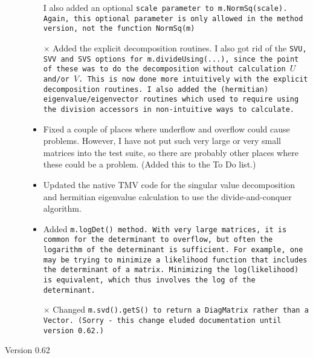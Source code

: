 \begin{description}
\begin{itemize}
I also added an optional \tt{scale} parameter to \tt{m.NormSq(scale)}.
Again, this optional parameter is only allowed in the method version, not the function \tt{NormSq(m)}
\item[$\times$]
Added the explicit decomposition routines.  I also
got rid of the \tt{SVU}, \tt{SVV} and \tt{SVS} options for \tt{m.divideUsing(...)}, since the point 
of these was to do the decomposition without calculation $U$ and/or $V$.  This is now done
more intuitively with the explicit decomposition routines.
I also added the (hermitian) eigenvalue/eigenvector routines which used to
require using the division accessors in non-intuitive ways to calculate.
\item 
Fixed a couple of places where underflow and overflow could cause problems.  However, I have
not put such very large or very small matrices into the test suite, so there are probably other
places where these could be a problem.  (Added this to the To Do list.)
\item
Updated the native TMV code for the singular value decomposition and hermitian 
eigenvalue calculation to use the divide-and-conquer algorithm.
\item
Added \tt{m.logDet()} method.  With very large matrices, it is common for the determinant
to overflow, but often the logarithm of the determinant is sufficient.  
For example, one may be trying to minimize a 
likelihood function that
includes the determinant of a matrix.  Minimizing the log(likelihood) is equivalent, which
thus involves the log of the determinant.  
\item[$\times$]
Changed \tt{m.svd().getS()} to return a \tt{DiagMatrix} rather than a \tt{Vector}.
(Sorry - this change eluded documentation until version 0.62.)
\end{itemize}

\item[Version 0.62]


\end{description}

